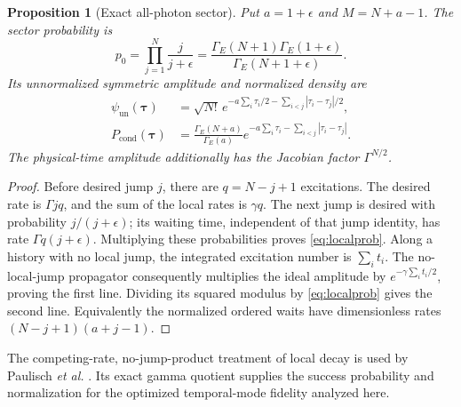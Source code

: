 \documentclass[11pt,a4paper]{article}
\newtheorem{proposition}[theorem]{Proposition}
\newcommand{\GE}{\Gamma_{\!E}}
\begin{document}
\begin{proposition}[Exact all-photon sector]
Put \(a=1+\epsilon\) and \(M=N+a-1\). The sector probability is
\begin{equation}
 p_0=\prod_{j=1}^N\frac{j}{j+\epsilon}
 =\frac{\GE(N+1)\GE(1+\epsilon)}{\GE(N+1+\epsilon)}.
 \label{eq:localprob}
\end{equation}
Its unnormalized symmetric amplitude and normalized density are
\begin{align}
 \psi_{\mathrm{un}}(\boldsymbol\tau)
 &=\sqrt{N!}\,
   e^{-a\sum_i\tau_i/2-\sum_{i<j}|\tau_i-\tau_j|/2},\\
 P_{\mathrm{cond}}(\boldsymbol\tau)
 &=\frac{\GE(N+a)}{\GE(a)}
   e^{-a\sum_i\tau_i-\sum_{i<j}|\tau_i-\tau_j|}.
 \label{eq:localkernel}
\end{align}
The physical-time amplitude additionally has the Jacobian factor
\(\Gamma^{N/2}\).
\end{proposition}
\begin{proof}
Before desired jump \(j\), there are \(q=N-j+1\) excitations.
The desired rate is \(\Gamma jq\), and the sum of the local rates is
\(\gamma q\). The next jump is desired with probability
\(j/(j+\epsilon)\); its waiting time, independent of that jump
identity, has rate \(\Gamma q(j+\epsilon)\). Multiplying these
probabilities proves \eqref{eq:localprob}. Along a history with no
local jump, the integrated excitation number is \(\sum_i t_i\).
The no-local-jump propagator consequently multiplies the ideal
amplitude by \(e^{-\gamma\sum_i t_i/2}\), proving the first line.
Dividing its squared modulus by \eqref{eq:localprob} gives the
second line. Equivalently the normalized ordered waits have
dimensionless rates \((N-j+1)(a+j-1)\).
\end{proof}

The competing-rate, no-jump-product treatment of local decay is
used by Paulisch \emph{et al.} \cite{paulisch}. Its exact gamma
quotient supplies the success probability and normalization for
the optimized temporal-mode fidelity analyzed here.
\end{document}
